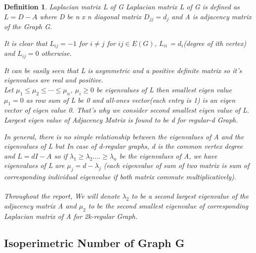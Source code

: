 \documentclass[oneside]{book}
\newtheorem{mydef}{Definition}
\begin{document}
\begin{mydef}
     
     {Laplacian matrix L of G }
     \label{ss:22}
      Laplacian matrix L of G is defined as  $L = D - A$ where  D be n x n diagonal matrix $D_{jj} = d_{j}$ and A is adjacency matrix of the Graph G.\par
      
          
            
          It is clear that   $L_{ij} = -1$ for $i\neq j$  for $ij\in E(G)$,  $L_{ii}$ = $d_i$(degree of ith vertex) and   $L_{ij} = 0$ otherwise.\par
          
          It can be easily seen that L is asymmetric and a positive definite  matrix so it's eigenvalues are real and positive. \\
         
          Let $\mu_{1} \leq \mu_{2} \leq \cdots \leq \mu_{n}$, $\mu_{i} \geq 0$  be  eigenvalues of L then smallest eigen value $\mu_{1} = 0$ as row sum of L  be 0 and all-ones vector(each entry is 1) is an eigen vector of eigen value 0. That's why we consider second smallest eigen value of L. Largest eigen value of Adjacency Matrix is found to be d for regular-d Graph. \par
          
          
            
         
In general, there is no simple relationship between the eigenvalues of
A and the eigenvalues of L but In case of d-regular graphs, d is the
common vertex degree and $L = dI - A$  so if $\lambda_{1} \geq \lambda_{2}....\geq \lambda_{n}$  be the eigenvalues of A, we have eigenvalues of L are $\mu_{j} = d - \lambda_{j}$ (each eigenvalue of sum of two matrix is sum of corresponding  individual eigenvalue if both matrix commute multiplicatively). \\\\
Throughout the report, We will denote $\lambda_{2} $ to be a second largest eigenvalue of the adjacency matrix A and $\mu_{2}$ to be the second smallest eigenvalue of corresponding Laplacian matrix of A for 2k-regular Graph.  
          
           
         
           \subsection{Isoperimetric Number of Graph G} \label{ss:23}
           

\end{mydef}
\end{document}
